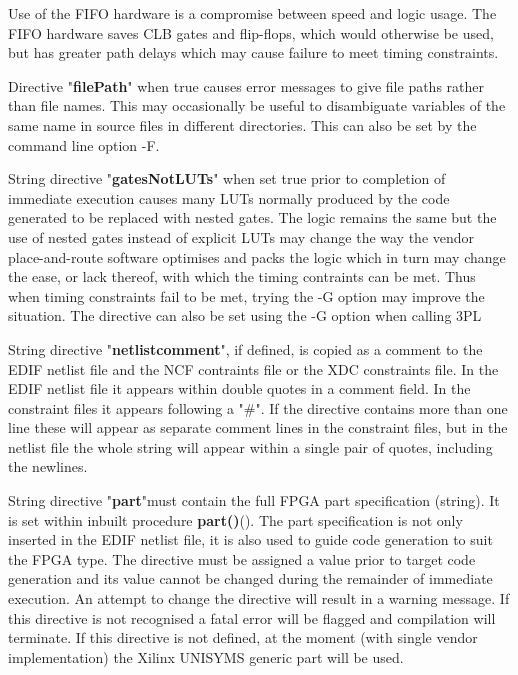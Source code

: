         Use of the FIFO hardware is a compromise between speed and logic
        usage. The FIFO hardware saves CLB gates and flip-flops, which would
        otherwise be used, but has greater path delays which may cause
        failure to meet timing constraints.
        
        Directive "{\bf filePath}" when true causes error messages to
        give file paths rather than file names. This may occasionally
        be useful to disambiguate variables of the same name in source
        files in different directories. This can also be set by the command
        line option -F.

        String directive "{\bf gatesNotLUTs}" when set true prior to
        completion of immediate execution causes many LUTs normally produced by
        the code generated to be replaced with nested gates. The logic remains
        the same but the use of nested gates instead of explicit LUTs may change
        the way the vendor place-and-route software optimises and packs the
        logic which in turn may change the ease, or lack thereof, with which the
        timing contraints can be met. Thus when timing constraints fail to be
        met, trying the -G option may improve the situation. The directive can
        also be set using the -G option when calling 3PL

        String directive "{\bf netlistcomment}", if defined, is copied as
        a comment to the EDIF netlist file and the NCF contraints file or the
        XDC constraints file. In the EDIF netlist file it appears within double
        quotes in a comment field. In the constraint files it appears following
        a "\#". If the directive contains more than one line these will appear
        as separate comment lines in the constraint files, but in the netlist
        file the whole string will appear within a single pair of quotes,
        including the newlines.

        String directive "{\bf part}"must contain the full FPGA part
        specification (string). It is set within inbuilt procedure
        {\bf part()}(). The part specification is not only inserted in
        the EDIF netlist file, it is also used to guide code generation to suit
        the FPGA type. The directive must be assigned a value prior to target
        code generation and its value cannot be changed during  the remainder of
        immediate execution. An attempt to change the directive will result in a
        warning message. If this directive is not recognised a fatal error will
        be flagged and compilation will terminate. If this directive is not
        defined, at the moment (with single vendor implementation) the Xilinx
        UNISYMS generic part will be used.
        
